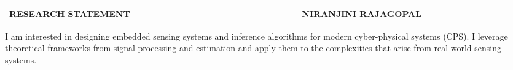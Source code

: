 \documentclass[10pt]{article}
\date{}
\begin{document}


\begin{table}
\color{blue}
\begin{tabular*}{\textwidth}{l r}
\large\textbf{RESEARCH STATEMENT} & 
\hfill \ \ \ \ \ \ \ \ \ \ \ \ \ \ \ \ \ \ \ \
\ \ \ \ \ \ \ \ \ \ \ \ \ 
\large\textbf{NIRANJINI RAJAGOPAL}\\
\hline
\end{tabular*}

\end{table}
 

I am interested in designing  embedded sensing systems and inference algorithms for modern cyber-physical systems (CPS). %
I leverage theoretical frameworks from signal processing and estimation and apply them to the complexities that arise from real-world sensing systems. 
% 
\end{document}

